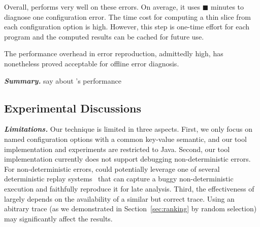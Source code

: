 Overall, \ourtool performs very well on these errors.
On average, it uses $\blacksquare$ minutes to
diagnose one configuration error. The time cost for
computing a thin slice from each configuration option
is high. However, this step is one-time effort
for each program and the computed results can be cached for future use.

The performance overhead in error reproduction,
admittedly high, has nonetheless proved acceptable
for offline error diagnosis.




\vspace{1mm}
\noindent \textbf{\textit{Summary.}} say about \ourtool's performance

\vspace{1mm}

\subsection{Experimental Discussions}


\noindent \textbf{\textit{Limitations.}} 
Our technique is limited in three aspects.
First, we only focus on named configuration options
with a common key-value semantic, and our tool implementation
and experiments are
restricted to Java. 
Second,  our tool implementation currently does not
support debugging non-deterministic errors. 
For non-deterministic errors, \ourtool could potentially leverage one of
several deterministic replay systems~\cite{Huang:2010:LLD}
that can capture a buggy non-deterministic
execution and faithfully reproduce it for late analysis.
Third, the effectiveness of \ourtool largely
depends on the availability of a similar but correct trace.
Using an abitrary trace (as we demonstrated in Section~\ref{sec:ranking}
by random selection) may significantly affect the results.







